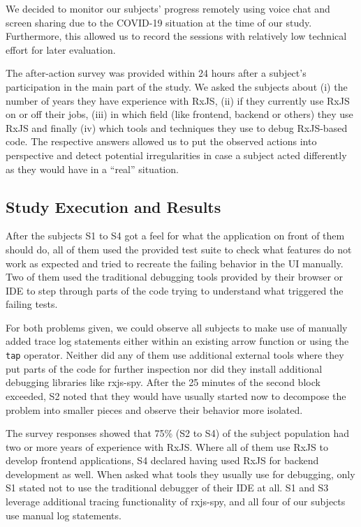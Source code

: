 \documentclass[12pt,a4paper]{article}
\begin{document}
We decided to monitor our subjects' progress remotely using voice chat and screen sharing due to the COVID-19 situation at the time of our study. Furthermore, this allowed us to record the sessions with relatively low technical effort for later evaluation.

The after-action survey was provided within 24 hours after a subject's participation in the main part of the study. We asked the subjects about (i) the number of years they have experience with RxJS, (ii) if they currently use RxJS on or off their jobs, (iii) in which field (like frontend, backend or others) they use RxJS and finally (iv) which tools and techniques they use to debug RxJS-based code. The respective answers allowed us to put the observed actions into perspective and detect potential irregularities in case a subject acted differently as they would have in a ``real'' situation.

\subsection{Study Execution and Results}

After the subjects S1 to S4 got a feel for what the application on front of them should do, all of them used the provided test suite to check what features do not work as expected and tried to recreate the failing behavior in the UI manually. Two of them used the traditional debugging tools provided by their browser or IDE to step through parts of the code trying to understand what triggered the failing tests.

For both problems given, we could observe all subjects to make use of manually added trace log statements either within an existing arrow function or using the \texttt{tap} operator. Neither did any of them use additional external tools where they put parts of the code for further inspection nor did they install additional debugging libraries like rxjs-spy.
After the 25 minutes of the second block exceeded, S2 noted that they would have usually started now to decompose the problem into smaller pieces and observe their behavior more isolated.

The survey responses showed that 75\% (S2 to S4) of the subject population had two or more years of experience with RxJS. Where all of them use RxJS to develop frontend applications, S4 declared having used  RxJS for backend development as well. When asked what tools they usually use for debugging, only S1 stated not to use the traditional debugger of their IDE at all. S1 and S3 leverage additional tracing functionality of rxjs-spy, and all four of our subjects use manual log statements.
\end{document}
